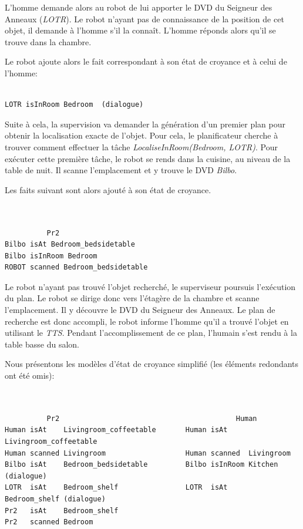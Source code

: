 \documentclass[a4paper,11pt,twoside]{StyleThese}
\begin{document}
L'homme demande alors au robot de lui apporter le DVD du Seigneur des Anneaux (\textit{LOTR}).
Le robot n'ayant pas de connaissance de la position de cet objet, il demande à l'homme s'il la connaît.
L'homme réponds alors qu'il se trouve dans la chambre.

Le robot ajoute alors le fait correspondant à son état de croyance et à celui de l'homme:

\begin{scriptsize}
\begin{verbatim}

LOTR isInRoom Bedroom  (dialogue)

\end{verbatim}
\end{scriptsize}

Suite à cela, la supervision va demander la génération d'un premier plan pour obtenir la localisation exacte de l'objet. Pour cela, le planificateur cherche à trouver comment effectuer la tâche \textit{LocaliseInRoom(Bedroom, LOTR)}.
Pour exécuter cette première tâche, le robot se rends dans la cuisine, au niveau de la table de nuit. Il scanne l'emplacement et y trouve le DVD \textit{Bilbo}.

Les faits suivant sont alors ajouté à son état de croyance.

\begin{scriptsize}
\begin{verbatim}


          Pr2
Bilbo isAt Bedroom_bedsidetable
Bilbo isInRoom Bedroom
ROBOT scanned Bedroom_bedsidetable

\end{verbatim}
\end{scriptsize}

Le robot n'ayant pas trouvé l'objet recherché, le superviseur poursuis l'exécution du plan. Le robot se dirige donc vers l'étagère de la chambre et scanne l'emplacement.
Il y découvre le DVD du Seigneur des Anneaux.
Le plan de recherche est donc accompli, le robot informe l'homme qu'il a trouvé l'objet en utilisant le \textit{TTS}.
Pendant l'accomplissement de ce plan, l'humain s'est rendu à la table basse du salon.

Nous présentons les modèles d'état de croyance simplifié (les éléments redondants ont été omis):

\begin{scriptsize}
\begin{verbatim}


          Pr2                                          Human
Human isAt    Livingroom_coffeetable       Human isAt     Livingroom_coffeetable
Human scanned Livingroom                   Human scanned  Livingroom
Bilbo isAt    Bedroom_bedsidetable         Bilbo isInRoom Kitchen (dialogue)
LOTR  isAt    Bedroom_shelf                LOTR  isAt     Bedroom_shelf (dialogue)
Pr2   isAt    Bedroom_shelf                
Pr2   scanned Bedroom

\end{verbatim}
\end{scriptsize}
\end{document}
